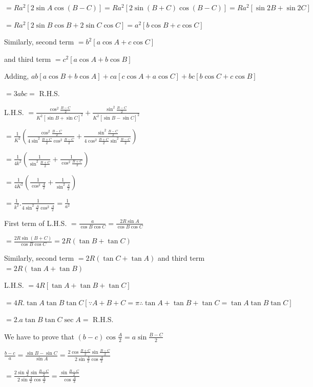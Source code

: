   $= Ra^2[2\sin A\cos(B - C)] = Ra^2[2\sin(B + C)\cos(B - C)] = Ra^2[\sin2B + \sin2C]$

  $=Ra^2[2\sin B\cos B + 2\sin C\cos C] = a^2[b\cos B + c\cos C]$

  Similarly, second term $= b^2[a\cos A + c\cos C]$

  and third term $= c^2[a\cos A + b\cos B]$

  Adding, $ab[a\cos B + b\cos A] + ca[c\cos A + a\cos C] + bc[b\cos C + c\cos B]$

  $= 3abc =$ R.H.S.

\item L.H.S. $= \frac{\cos^2\frac{B - C}{2}}{K^2[\sin B + \sin C]^2} + \frac{\sin^2\frac{B - C}{2}}{K^2[\sin B - \sin C]^2}$

  $= \frac{1}{K^2}\left(\frac{\cos^2\frac{B - C}{2}}{4\sin^2\frac{B + C}{2}\cos^2\frac{B - C}{2}} + \frac{\sin^2\frac{B -
    C}{2}}{4\cos^2\frac{B + C}{2}\sin^2\frac{B - C}{2}}\right)$

  $= \frac{1}{4k^2}\left(\frac{1}{\sin^2\frac{B + C}{2}} + \frac{1}{\cos^2\frac{B + C}{2}}\right)$

  $= \frac{1}{4K^2}\left(\frac{1}{\cos^2\frac{A}{2}} + \frac{1}{\sin^2\frac{A}{2}}\right)$

  $= \frac{1}{k^2}.\frac{1}{4\sin^2\frac{A}{2}\cos^2\frac{A}{2}} = \frac{1}{a^2}$

\item First term of L.H.S. $= \frac{a}{\cos B\cos C} = \frac{2R\sin A}{\cos B\cos C}$

  $= \frac{2R\sin(B + C)}{\cos B\cos C} = 2R(\tan B + \tan C)$

  Similarly, second term $= 2R(\tan C + \tan A)$ and third term $= 2R(\tan A + \tan B)$

  L.H.S. $= 4R[\tan A + \tan B + \tan C]$

  $= 4R.\tan A\tan B\tan C[\because A + B + C = \pi \therefore \tan A + \tan B + \tan C = \tan A\tan B\tan C]$

  $= 2.a\tan B\tan C\sec A =$ R.H.S.

\item We have to prove that $(b - c)\cos\frac{A}{2} = a\sin\frac{B - C}{2}$

  $\frac{b - c}{a} = \frac{\sin B - \sin C}{\sin A} = \frac{2\cos\frac{B + C}{2}\sin \frac{B -
    C}{2}}{2\sin\frac{A}{2}\cos\frac{A}{2}}$

  $= \frac{2\sin\frac{A}{2}\sin\frac{B - C}{2}}{2\sin\frac{A}{2}\cos\frac{A}{2}} = \frac{\sin\frac{B - C}{2}}{\cos\frac{A}{3}}$

